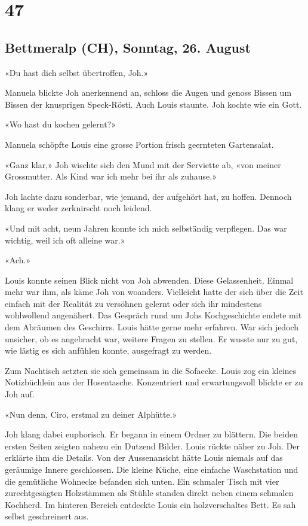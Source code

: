 \chapter{47}

\section{Bettmeralp (CH), Sonntag, 26.
August}



«Du hast dich selbst übertroffen, Joh.»

Manuela blickte Joh anerkennend an, schloss die Augen und genoss Bissen
um Bissen der knusprigen Speck-Rösti. Auch Louis staunte. Joh kochte
wie ein Gott.

«Wo hast du kochen gelernt?»

Manuela schöpfte Louis eine grosse Portion frisch geernteten
Gartensalat.

«Ganz klar,» Joh wischte sich den Mund mit der Serviette ab, «von meiner
Grossmutter. Als Kind war ich mehr bei ihr als zuhause.»

Joh lachte dazu sonderbar, wie jemand, der aufgehört hat, zu hoffen.
Dennoch klang er weder zerknirscht noch leidend.

«Und mit acht, neun Jahren konnte ich mich selbständig verpflegen. Das
war wichtig, weil ich oft alleine war.»

«Ach.»

Louis konnte seinen Blick nicht von Joh abwenden. Diese Gelassenheit. Einmal mehr war ihm,
als käme Joh von woanders. Vielleicht hatte der sich über die Zeit 
einfach mit der Realität zu versöhnen gelernt oder sich ihr mindestens
wohlwollend angenähert.
Das Gespräch rund um Johs Kochgeschichte endete mit dem Abräumen des
Geschirrs. Louis hätte gerne mehr erfahren. War sich jedoch unsicher, ob
es angebracht war, weitere Fragen zu stellen. Er wusste nur zu gut, wie
lästig es sich anfühlen konnte, ausgefragt zu werden.

Zum Nachtisch setzten sie sich gemeinsam in die Sofaecke.
Louis zog ein kleines Notizbüchlein aus der Hosentasche. Konzentriert und erwartungsvoll blickte er zu Joh auf.

«Nun denn, Ciro, erstmal zu deiner Alphütte.»

Joh klang dabei euphorisch. Er begann in einem Ordner zu blättern. Die
beiden ersten Seiten zeigten nahezu ein Dutzend Bilder. Louis rückte
näher zu Joh. Der erklärte ihm die Details. Von der Aussenansicht hätte
Louis niemals auf das geräumige Innere geschlossen. Die kleine Küche,
eine einfache Waschstation und die gemütliche Wohnecke befanden sich
unten. Ein schmaler Tisch mit vier zurechtgesägten Holzstämmen als
Stühle standen direkt neben einem schmalen Kochherd.
Im hinteren Bereich entdeckte Louis ein holzverschaltes Bett. Es sah
selbst geschreinert aus.

